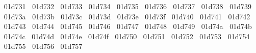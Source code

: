 {  ^^^^^^01d731%
  ^^^^^^01d732%
  ^^^^^^01d733%
  ^^^^^^01d734%
  ^^^^^^01d735%
  ^^^^^^01d736%
  ^^^^^^01d737%
  ^^^^^^01d738%
  ^^^^^^01d739%
  ^^^^^^01d73a%
  ^^^^^^01d73b%
  ^^^^^^01d73c%
  ^^^^^^01d73d%
  ^^^^^^01d73e%
  ^^^^^^01d73f%
  ^^^^^^01d740%
  ^^^^^^01d741%
  ^^^^^^01d742%
  ^^^^^^01d743%
  ^^^^^^01d744%
  ^^^^^^01d745%
  ^^^^^^01d746%
  ^^^^^^01d747%
  ^^^^^^01d748%
  ^^^^^^01d749%
  ^^^^^^01d74a%
  ^^^^^^01d74b%
  ^^^^^^01d74c%
  ^^^^^^01d74d%
  ^^^^^^01d74e%
  ^^^^^^01d74f%
  ^^^^^^01d750%
  ^^^^^^01d751%
  ^^^^^^01d752%
  ^^^^^^01d753%
  ^^^^^^01d754%
  ^^^^^^01d755%
  ^^^^^^01d756%
  ^^^^^^01d757%
}
